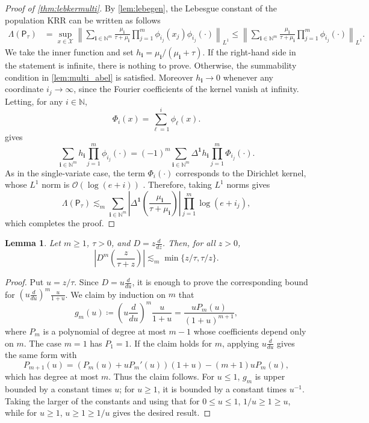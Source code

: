 \documentclass{article}
\let\cite\citep
\numberwithin{theorem}{section}
\newtheorem{lemma}[theorem]{Lemma}
\theoremstyle{definition}
\newcommand{\Os}{\mathcal O}
\newcommand{\Xs}{\mathcal X}
\begin{document}
\begin{proof}[Proof of \cref{thm:lebkermulti}]
    By \cref{lem:lebegen}, the Lebesgue constant of the population KRR can be written as follows
    \begin{align*}
        \Lambda(\mathsf{P}_{\tau})&=\sup_{x\in \Xs}\left\|\sum_{\bm i\in \mathbb N^m} \frac{\mu_{\bm i}}{\tau+\mu_{\bm i}}\prod_{j=1}^m \phi_{i_j}(x_j)\phi_{i_j}(\cdot)\right \|_{L^1}\le \left\|\sum_{\bm i\in \mathbb N^m} \frac{\mu_{\bm i}}{\tau+\mu_{\bm i}}\prod_{j=1}^m \phi_{i_j}(\cdot)\right \|_{L^1}.
    \end{align*}
    We take the inner function and set $h_{\bm i}=\mu_{\bm i}/(\mu_{\bm i}+\tau)$. If the right-hand side in the statement is infinite, there is nothing to prove. Otherwise, the summability condition in \cref{lem:multi_abel} is satisfied. Moreover $h_{\bm i}\to 0$ whenever any coordinate $i_j\to\infty$, since the Fourier coefficients of the kernel vanish at infinity. Letting, for any $i\in \mathbb N$,
    $$\Phi_i(x)=\sum_{\ell=1}^i \phi_\ell(x).$$
     gives
    $$\sum_{\bm i\in \mathbb N^m} h_{\bm i}\prod_{j=1}^m \phi_{i_j}(\cdot)=(-1)^m\sum_{\bm i\in \mathbb N^m} \Delta^{\bm 1}h_{\bm i}\prod_{j=1}^m \Phi_{i_j}(\cdot).$$
    As in the single-variate case, the term $\Phi_i(\cdot)$ corresponds to the Dirichlet kernel, whose $L^1$ norm is $\Os(\log(e+i))$ \cite{folland2009fourier}.
    Therefore, taking $L^1$ norms gives
    $$\Lambda(\mathsf{P}_{\tau})\lesssim_m\sum_{\bm i\in \mathbb N^m} \left|\Delta^{\bm 1}\left(\frac{\mu_{\bm i}}{\tau+\mu_{\bm i}}\right)\right|\prod_{j=1}^m\log(e+i_j),$$
    which completes the proof.
\end{proof}



\begin{lemma}\label{lem:rational_log_derivative}
    Let $m\ge 1$, $\tau>0$, and $D=z\frac{d}{dz}$. Then, for all $z>0$,
    $$\left|D^m\left(\frac{z}{\tau+z}\right)\right|\lesssim_m \min\{z/\tau,\tau/z\}.$$
\end{lemma}
\begin{proof}
    Put $u=z/\tau$. Since $D=u\frac{d}{du}$, it is enough to prove the corresponding bound for $(u\frac{d}{du})^m\frac{u}{1+u}$. We claim by induction on $m$ that
    $$
    g_m(u)\coloneqq
    \left(u\frac{d}{du}\right)^m\frac{u}{1+u}=\frac{uP_m(u)}{(1+u)^{m+1}},$$
    where $P_m$ is a polynomial of degree at most $m-1$ whose coefficients depend only on $m$. The case $m=1$ has $P_1=1$. If the claim holds for $m$, applying $u\frac{d}{du}$ gives the same form with
    $$P_{m+1}(u)=\left(P_m(u)+uP_m'(u)\right)(1+u)-(m+1)uP_m(u),$$
    which has degree at most $m$. Thus the claim follows. For $u\le 1$, $g_m$ is upper bounded by a constant times $u$; for $u\ge 1$, it is bounded by a constant times $u^{-1}$. 
    Taking the larger of the constants and using that for $0\le u\le 1$, $1/u\ge 1 \ge u$, while for $u\ge 1$, $u\ge 1\ge 1/u$ gives the desired result.
\end{proof}
\end{document}
